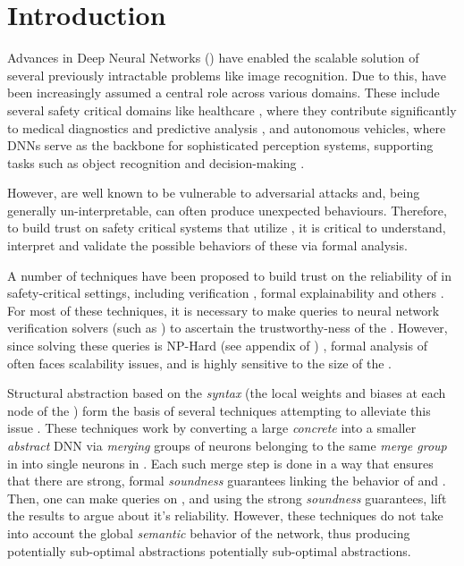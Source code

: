 
\section{Introduction}

Advances in Deep Neural Networks (\dnn) have enabled the scalable solution
of several previously intractable problems like image recognition. Due to this, \dnn have been increasingly assumed a central role
across various domains. These include several safety critical domains like
healthcare \cite{b1}, where they contribute significantly to medical diagnostics
and predictive analysis \cite{b2}, and autonomous vehicles, where DNNs serve as
the backbone for sophisticated perception systems, supporting tasks such as
object recognition and decision-making \cite{b3}. 

However, \dnn are well known to be vulnerable to adversarial attacks  and, being generally un-interpretable, can often produce unexpected
behaviours. Therefore, to build trust on safety critical systems that utilize
\dnn, it is  critical to understand, interpret and validate
the possible behaviors of these \dnn via formal analysis. 

A number of techniques have been proposed to build trust on the reliability
of \dnn in safety-critical settings, including verification \cite{reluplex,
deeppoly} , formal explainability \cite{overview-fxai,
minimal-image-fxai} and others . For most of these
techniques, it is necessary to make queries to neural network verification
solvers (such as \cite{reluplex}) to ascertain the trustworthy-ness of the \dnn.
 However, since solving these queries is NP-Hard (see appendix of
\cite{reluplex}) , formal analysis of \dnn
often faces scalability issues, and is highly sensitive to the size of the \dnn.

Structural abstraction based on the \textit{syntax} (the local weights and biases at each
node of the \dnn) form the basis of several techniques attempting to alleviate
this issue \cite{cegar-nn, cegarette, cleverest-nn, conv-abs-gk}. These
techniques work by converting a large \textit{concrete} \dnn \cnc into a smaller
\textit{abstract} DNN \abs via \textit{merging} groups of neurons belonging to
the same \textit{merge group} in \cnc into single neurons in \abs. Each such
merge step is done in a way that ensures that there are strong, formal
\textit{soundness} guarantees linking the behavior of \cnc and \abs. Then, one
can make queries on \abs, and using the strong \textit{soundness} guarantees,
lift the results to \cnc argue about it's reliability. However, these techniques
do not take into account the global \textit{semantic} behavior of the network,
thus producing potentially sub-optimal abstractions potentially sub-optimal
abstractions. 

